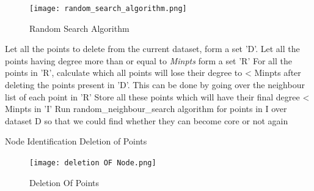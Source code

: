 \documentclass[acmsmall]{acmart}
\begin{document}
\begin{enumerate}
\begin{figure}[H]
    \centering
    \texttt{[image: random\_search\_algorithm.png]}
    \caption{Random Search Algorithm}
    \label{fig:my_label}
\end{figure}  

\begin{algorithm}
    \SetAlgoLined
    Let all the points to delete from the current dataset, form a set 'D'. Let all the points having degree more than or equal to \textit{Minpts} form a set 'R'\;
    For all the points in 'R', calculate which all points will lose their degree to < Minpts after deleting the points present in 'D'. This can be done by going over the neighbour list of each point in 'R'\;
    Store all these points which will have their final degree < Minpts in 'I'\;
    Run random\_neighbour\_search algorithm for points in I over dataset D so that we could find whether they can become core or not again\;
    \caption{Node Identification Deletion of Points}
\end{algorithm}
\begin{figure}[H]
    \centering
    \texttt{[image: deletion OF Node.png]}
    \caption{Deletion Of Points}
    \label{fig:my_label}
\end{figure}


\end{enumerate}
\end{document}

